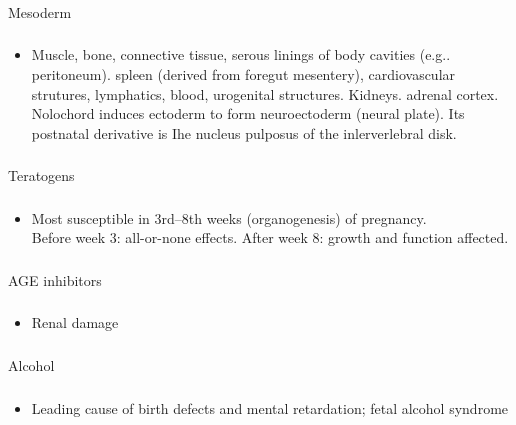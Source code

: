 \documentclass[11pt]{beamer}
\begin{document}
\begin{frame}
 \frametitle{}
Mesoderm
\end{frame}

\begin{frame}
 \frametitle{}
\begin{itemize}
\item{Muscle, bone, connective tissue, serous linings of body cavities (e.g.. peritoneum).  spleen (derived from foregut mesentery), cardiovascular strutures, lymphatics, blood, urogenital structures. Kidneys. adrenal cortex. \\ Nolochord induces ectoderm to form neuroectoderm (neural plate). Its postnatal derivative is Ihe nucleus pulposus of the inlerverlebral disk.}
\end{itemize}
\end{frame}

\begin{frame}
 \frametitle{}
Teratogens
\end{frame}

\begin{frame}
 \frametitle{}
\begin{itemize}
\item{Most susceptible in 3rd–8th weeks (organogenesis) of pregnancy. \\ Before week 3: all-or-none effects. After week 8: growth and function affected. }
\end{itemize}
\end{frame}

\begin{frame}
 \frametitle{}
AGE inhibitors
\end{frame}

\begin{frame}
 \frametitle{}
\begin{itemize}
\item{Renal damage}
\end{itemize}
\end{frame}

\begin{frame}
 \frametitle{}
Alcohol
\end{frame}

\begin{frame}
 \frametitle{}
\begin{itemize}
\item{Leading cause of birth defects and mental retardation; fetal alcohol syndrome}
\end{itemize}
\end{frame}
\end{document}
